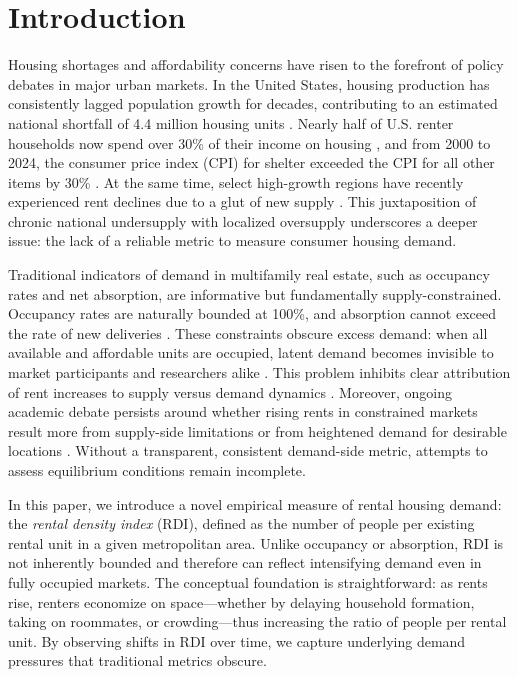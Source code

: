 \documentclass[APA,Times1COL]{WileyNJDv5} %
\begin{document}
\section{Introduction}\label{sec1}
Housing shortages and affordability concerns have risen to the forefront of policy debates in major urban markets. In the United States, housing production has consistently lagged population growth for decades, contributing to an estimated national shortfall of 4.4 million housing units \cite{betancourt2022us}. Nearly half of U.S. renter households now spend over 30\% of their income on housing \cite{censusNearlyHalf}, and from 2000 to 2024, the consumer price index (CPI) for shelter exceeded the CPI for all other items by 30\% \cite{stlouisfedConsumerPrice}. At the same time, select high-growth regions have recently experienced rent declines due to a glut of new supply \cite{mott2024ThisRegion}. This juxtaposition of chronic national undersupply with localized oversupply underscores a deeper issue: the lack of a reliable metric to measure consumer housing demand.

Traditional indicators of demand in multifamily real estate, such as occupancy rates and net absorption, are informative but fundamentally supply-constrained. Occupancy rates are naturally bounded at 100\%, and absorption cannot exceed the rate of new deliveries \cite{mueller1999real}. These constraints obscure excess demand: when all available and affordable units are occupied, latent demand becomes invisible to market participants and researchers alike \cite{gabriel2001rental, sirmans1991determinants, pyhrr1999real}. This problem inhibits clear attribution of rent increases to supply versus demand dynamics \cite{pennington2021does, molloy2022housing}. Moreover, ongoing academic debate persists around whether rising rents in constrained markets result more from supply-side limitations \cite{saiz2010geographic} or from heightened demand for desirable locations \cite{davidoff2015supply}. Without a transparent, consistent demand-side metric, attempts to assess equilibrium conditions remain incomplete.

In this paper, we introduce a novel empirical measure of rental housing demand: the \textit{rental density index} (RDI), defined as the number of people per existing rental unit in a given metropolitan area. Unlike occupancy or absorption, RDI is not inherently bounded and therefore can reflect intensifying demand even in fully occupied markets. The conceptual foundation is straightforward: as rents rise, renters economize on space---whether by delaying household formation, taking on roommates, or crowding---thus increasing the ratio of people per rental unit. By observing shifts in RDI over time, we capture underlying demand pressures that traditional metrics obscure.
\end{document}
